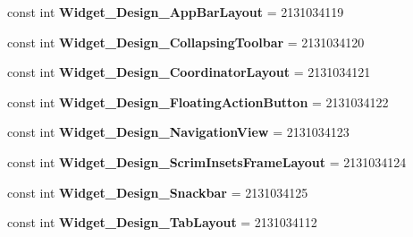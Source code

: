 \begin{DoxyCompactItemize}
\item 
\hypertarget{classClient_1_1Droid_1_1Resource_1_1Style_a3b46450f2137762c0151df75816fac68}{}const int {\bfseries Widget\+\_\+\+Design\+\_\+\+App\+Bar\+Layout} = 2131034119\label{classClient_1_1Droid_1_1Resource_1_1Style_a3b46450f2137762c0151df75816fac68}

\item 
\hypertarget{classClient_1_1Droid_1_1Resource_1_1Style_ad75f7af0f904634099bc5f3c255b5ad2}{}const int {\bfseries Widget\+\_\+\+Design\+\_\+\+Collapsing\+Toolbar} = 2131034120\label{classClient_1_1Droid_1_1Resource_1_1Style_ad75f7af0f904634099bc5f3c255b5ad2}

\item 
\hypertarget{classClient_1_1Droid_1_1Resource_1_1Style_a8325513996b40721ba9854c54683a6cb}{}const int {\bfseries Widget\+\_\+\+Design\+\_\+\+Coordinator\+Layout} = 2131034121\label{classClient_1_1Droid_1_1Resource_1_1Style_a8325513996b40721ba9854c54683a6cb}

\item 
\hypertarget{classClient_1_1Droid_1_1Resource_1_1Style_ab7c54404d29c0cca2f07c66867125202}{}const int {\bfseries Widget\+\_\+\+Design\+\_\+\+Floating\+Action\+Button} = 2131034122\label{classClient_1_1Droid_1_1Resource_1_1Style_ab7c54404d29c0cca2f07c66867125202}

\item 
\hypertarget{classClient_1_1Droid_1_1Resource_1_1Style_abaec1c88628be82e03348c128c63d528}{}const int {\bfseries Widget\+\_\+\+Design\+\_\+\+Navigation\+View} = 2131034123\label{classClient_1_1Droid_1_1Resource_1_1Style_abaec1c88628be82e03348c128c63d528}

\item 
\hypertarget{classClient_1_1Droid_1_1Resource_1_1Style_a4a6160f05bfd2cee839c9246c8d8d365}{}const int {\bfseries Widget\+\_\+\+Design\+\_\+\+Scrim\+Insets\+Frame\+Layout} = 2131034124\label{classClient_1_1Droid_1_1Resource_1_1Style_a4a6160f05bfd2cee839c9246c8d8d365}

\item 
\hypertarget{classClient_1_1Droid_1_1Resource_1_1Style_af3733880ffa7f268fc1e270f09db10ac}{}const int {\bfseries Widget\+\_\+\+Design\+\_\+\+Snackbar} = 2131034125\label{classClient_1_1Droid_1_1Resource_1_1Style_af3733880ffa7f268fc1e270f09db10ac}

\item 
\hypertarget{classClient_1_1Droid_1_1Resource_1_1Style_ab27d03102be45c57dc1cd483cd5c5994}{}const int {\bfseries Widget\+\_\+\+Design\+\_\+\+Tab\+Layout} = 2131034112\label{classClient_1_1Droid_1_1Resource_1_1Style_ab27d03102be45c57dc1cd483cd5c5994}


\end{DoxyCompactItemize}
